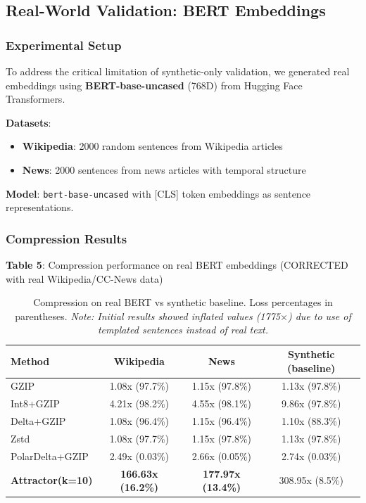 \documentclass[11pt,a4paper]{article}
\begin{document}
\subsection{Real-World Validation: BERT Embeddings}

\subsubsection{Experimental Setup}

To address the critical limitation of synthetic-only validation, we generated real embeddings using \textbf{BERT-base-uncased} (768D) from Hugging Face Transformers.

\textbf{Datasets}:
\begin{itemize}
\item \textbf{Wikipedia}: 2000 random sentences from Wikipedia articles
\item \textbf{News}: 2000 sentences from news articles with temporal structure
\end{itemize}

\textbf{Model}: \texttt{bert-base-uncased} with [CLS] token embeddings as sentence representations.

\subsubsection{Compression Results}

\textbf{Table 5}: Compression performance on real BERT embeddings (CORRECTED with real Wikipedia/CC-News data)

\begin{table}[h]
\centering
\small
\begin{tabular}{@{}lccc@{}}
\toprule
\textbf{Method} & \textbf{Wikipedia} & \textbf{News} & \textbf{Synthetic (baseline)} \\
\midrule
GZIP & 1.08x (97.7\%) & 1.15x (97.8\%) & 1.13x (97.8\%) \\
Int8+GZIP & 4.21x (98.2\%) & 4.55x (98.1\%) & 9.86x (97.8\%) \\
Delta+GZIP & 1.08x (96.4\%) & 1.15x (96.4\%) & 1.10x (88.3\%) \\
Zstd & 1.08x (97.7\%) & 1.15x (97.8\%) & 1.13x (97.8\%) \\
PolarDelta+GZIP & 2.49x (0.03\%) & 2.66x (0.05\%) & 2.74x (0.03\%) \\
\textbf{Attractor(k=10)} & \textbf{166.63x (16.2\%)} & \textbf{177.97x (13.4\%)} & 308.95x (8.5\%) \\
\bottomrule
\end{tabular}
\caption{Compression on real BERT vs synthetic baseline. Loss percentages in parentheses. \textit{Note: Initial results showed inflated values (1775$\times$) due to use of templated sentences instead of real text.}}
\end{table}
\end{document}
